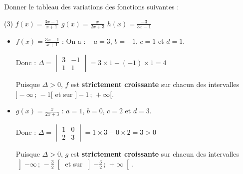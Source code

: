 \documentclass[10pt, a4paper]{article}
\begin{document}
\begin{Application}[][30 min]
Donner le tableau des variations des fonctions suivantes :
\vspace{0.2cm}
\begin{tasks}[ label-width=15pt, item-indent=20pt](3)
    \task $f(x) = \frac{3x-1}{x+1}$
    \task $g(x) = \frac{x}{2x+3}$
    \task $h(x) = \frac{-3}{3x-1}$
\end{tasks}
\end{Application}

\begin{Solution}[APPLICATION][25]
\begin{itemize}[leftmargin=*,itemsep=0.5pt]
    \item $f(x) = \frac{3x-1}{x+1}$ : \quad On a : ~ $a = 3$, $b = -1$, $c = 1$ et $d = 1$.

    Donc : \quad $\Delta = \begin{vmatrix} 3 & -1 \\ 1 & 1 \end{vmatrix} = 3 \times 1 - (-1) \times 1 = 4$

    Puisque $\Delta > 0$, $f$ est \textbf{strictement croissante} sur chacun des intervalles $\big]-\infty\,;\,-1\big[$ et sur $\big]-1\,;\,+\infty\big[$.

    \begin{center}
    \end{center}

    \item $g(x) = \frac{x}{2x+3}$ : \quad $a = 1$, $b = 0$, $c = 2$ et $d = 3$.

    Donc : \quad $\Delta = \begin{vmatrix} 1 & 0 \\ 2 & 3 \end{vmatrix} = 1 \times 3 - 0 \times 2 = 3 > 0$

    Puisque $\Delta > 0$, $g$ est \textbf{strictement croissante} sur chacun des intervalles $\left]-\infty\,;\,-\frac{3}{2}\right[$ et sur $\left]-\frac{3}{2}\,;\,+\infty\right[$.

    \begin{center}
    \end{center}


\end{itemize}
\end{Solution}
\end{document}
